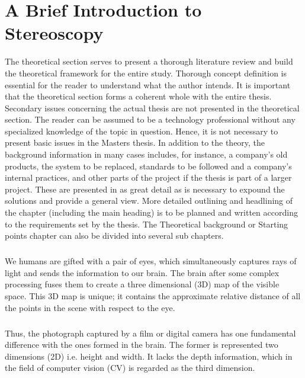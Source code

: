\chapter{A Brief Introduction to Stereoscopy}

The theoretical section serves to present a thorough literature review and build the 
theoretical framework for the entire study. Thorough concept definition is essential for 
the  reader  to  understand  what  the  author  intends.  It  is  important  that  the  theoretical 
section forms a coherent whole with the entire thesis. Secondary issues concerning the 
actual thesis are not presented in the theoretical section. The reader can be assumed to 
be  a  technology  professional  without  any  specialized  knowledge  of  the  topic  in 
question. Hence, it is not necessary to present basic issues in the Masters thesis. 
In  addition  to  the  theory,  the  background  information  in  many  cases  includes,  for 
instance, a company's old products, the system to be replaced, standards to be followed 
and a company's internal practices, and other parts of the project if the thesis is part of a 
larger  project.  These  are  presented  in  as  great  detail  as  is  necessary  to  expound  the 
solutions and provide a general view.  
More detailed outlining and headlining of the chapter (including the main heading) 
is  to  be  planned  and  written  according  to  the  requirements  set  by  the  thesis.  The 
Theoretical  background  or  Starting  points  chapter  can  also  be  divided  into  several 
sub chapters.   

\paragraph{}
We humans are gifted with a pair of eyes, which simultaneously captures rays of light and sends the 
information to our brain. The brain after some complex processing fuses them to create a three dimensional
(3D) map of the visible space. This 3D map is unique; it contains the approximate relative distance
of all the points in the scene with respect to the eye.

\paragraph{}
Thus, the photograph captured by a film or digital camera has one fundamental difference with the ones formed 
in the brain. The former is represented two dimensions (2D) i.e. height and width. It lacks the depth information, which in the field of computer vision (CV) is regarded as the third dimension.

